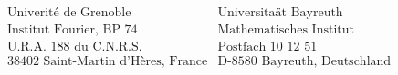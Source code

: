\medskip
$$
\begin{array}{ll}
\text{Univerit\'e de Grenoble} &  \text{Universita\"at Bayreuth}\\
\text{Institut Fourier, BP 74} &  \text{Mathematisches Institut}\\
\text{U.R.A. 188 du C.N.R.S.} & \text{Postfach 10 12 51}\\
\text{38402 Saint-Martin d'H\`eres, France} & \text{D-8580 Bayreuth, Deutschland}\\
\end{array}
$$
